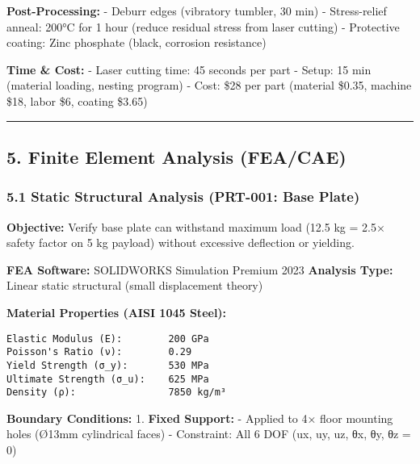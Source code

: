 \documentclass[
]{article}
\begin{document}
\textbf{Post-Processing:} - Deburr edges (vibratory tumbler, 30 min) -
Stress-relief anneal: 200°C for 1 hour (reduce residual stress from
laser cutting) - Protective coating: Zinc phosphate (black, corrosion
resistance)

\textbf{Time \& Cost:} - Laser cutting time: 45 seconds per part -
Setup: 15 min (material loading, nesting program) - Cost: \$28 per part
(material \$0.35, machine \$18, labor \$6, coating \$3.65)

\begin{center}\rule{0.5\linewidth}{0.5pt}\end{center}

\hypertarget{finite-element-analysis-feacae}{%
\subsection{5. Finite Element Analysis
(FEA/CAE)}\label{finite-element-analysis-feacae}}

\hypertarget{static-structural-analysis-prt-001-base-plate}{%
\subsubsection{5.1 Static Structural Analysis (PRT-001: Base
Plate)}\label{static-structural-analysis-prt-001-base-plate}}

\textbf{Objective:} Verify base plate can withstand maximum load (12.5
kg = 2.5× safety factor on 5 kg payload) without excessive deflection or
yielding.

\textbf{FEA Software:} SOLIDWORKS Simulation Premium 2023
\textbf{Analysis Type:} Linear static structural (small displacement
theory)

\textbf{Material Properties (AISI 1045 Steel):}

\begin{verbatim}
Elastic Modulus (E):        200 GPa
Poisson's Ratio (ν):        0.29
Yield Strength (σ_y):       530 MPa
Ultimate Strength (σ_u):    625 MPa
Density (ρ):                7850 kg/m³
\end{verbatim}

\textbf{Boundary Conditions:} 1. \textbf{Fixed Support:} - Applied to 4×
floor mounting holes (Ø13mm cylindrical faces) - Constraint: All 6 DOF
(ux, uy, uz, θx, θy, θz = 0)
\end{document}
